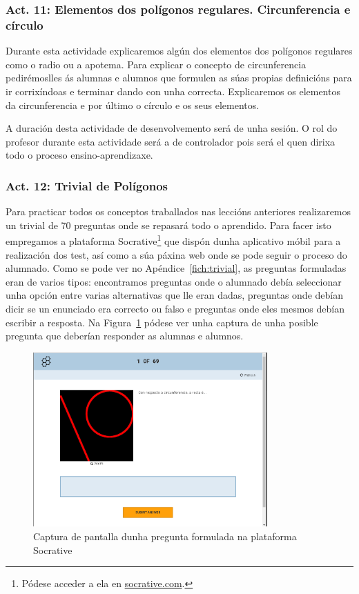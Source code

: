 \subsubsection{Act. 11: Elementos dos polígonos regulares. Circunferencia e círculo}\label{act:elementos}
Durante esta actividade explicaremos algún dos elementos dos polígonos regulares como o radio ou a apotema. Para explicar o concepto de circunferencia pedirémoslles ás alumnas e alumnos que formulen as súas propias definicións para ir corrixíndoas e terminar dando con unha correcta. Explicaremos os elementos da circunferencia e por último o círculo e os seus elementos.

A duración desta actividade de desenvolvemento será de unha sesión. O rol do profesor durante esta actividade será a de controlador pois será el quen dirixa todo o proceso ensino-aprendizaxe.

\subsubsection{Act. 12: Trivial de Polígonos}\label{act:trivial}
Para practicar todos os conceptos traballados nas leccións anteriores realizaremos un trivial de 70 preguntas onde se repasará todo o aprendido. Para facer isto empregamos a plataforma Socrative\footnote{Pódese acceder a ela en \href{http://www.socrative.com/}{socrative.com}.} que dispón dunha aplicativo móbil para a realización dos test, así como a súa páxina web onde se pode seguir o proceso do alumnado. Como se pode ver no Apéndice~\ref{fich:trivial}, as preguntas formuladas eran de varios tipos: encontramos preguntas onde o alumnado debía seleccionar unha opción entre varias alternativas que lle eran dadas, preguntas onde debían dicir se un enunciado era correcto ou falso e preguntas onde eles mesmos debían escribir a resposta. Na Figura~\ref{fig:act13} pódese ver unha captura de unha posible pregunta que deberían responder as alumnas e alumnos.

\begin{figure}[h!]
  \centering
  \includegraphics[width=0.8\textwidth]{img/socrative.png}
  \caption{Captura de pantalla dunha pregunta formulada na plataforma Socrative}\label{fig:act13}
\end{figure}

